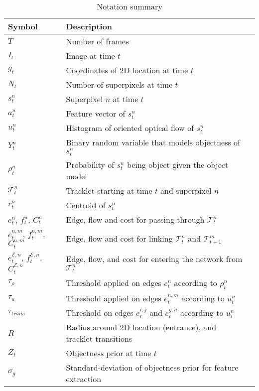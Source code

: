 \begin{table}[t!]
\begin{center}
\begin{tabular}{l l l}
\toprule
Symbol & Description\\
\toprule
$T$  & Number of frames\\
$I_t$  & Image at time $t$\\
$g_t$  & Coordinates of 2D location at time $t$\\
$N_t$  & Number of superpixels at time $t$\\
$s_{t}^n$  & Superpixel $n$ at time $t$ \\
$a_{t}^n$  & Feature vector of $s_t^n$\\
$u_{t}^n$  & Histogram of oriented optical flow of $s_t^n$\\
$Y_{t}^n$  & Binary random variable that models objectness of $s_t^n$\\
$\rho_{t}^n$  & Probability of $s_t^n$ being object given the object model\\
$\mathcal{T}_{t}^n$  & Tracklet starting at time $t$ and superpixel $n$\\
$r_{t}^n$  & Centroid of $s_t^n$\\
$e_{t}^n$, $f_{t}^n$, $C_{t}^n$ & Edge, flow and cost for passing through $\mathcal{T}_t^n$\\
$e_t^{n,m}$, $f_t^{n,m}$, $C_t^{n,m}$  & Edge, flow and cost for linking $\mathcal{T}_t^n$ and $\mathcal{T}_{t+1}^m$\\
$e_t^{\mathcal{E},n}$, $f_t^{\mathcal{E},n}$, $C_t^{\mathcal{E},n}$  & Edge, flow, and cost for entering the network from $\mathcal{T}_t^n$\\
$\tau_{\rho}$  & Threshold applied on edges $e_t^n$ according to $\rho_t^n$\\
$\tau_{u}$  & Threshold applied on edges $e_t^{n,m}$ according to $u_t^n$\\
$\tau_{trans}$  & Threshold on edges $e_t^{i,j}$ and $e_t^{g,n}$ according to $u_t^n$\\
$R$  & Radius around 2D location (entrance), and tracklet transitions \\
$Z_{t}$  & Objectness prior at time $t$\\
$\sigma_{g}$  & Standard-deviation of objectness prior for feature extraction\\
\bottomrule
\end{tabular}
\end{center}
\caption{Notation summary}
\label{tab:notation}
\end{table}



